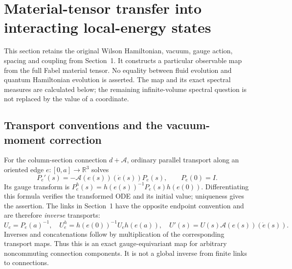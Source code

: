 \section{Material-tensor transfer into interacting local-energy states}
\label{sec:fabel-tensor}
This section retains the original Wilson Hamiltonian, vacuum, gauge action,
spacing and coupling from Section~1. It constructs a particular observable
map from the full Fabel material tensor. No equality between fluid evolution
and quantum Hamiltonian evolution is asserted. The map and its exact
spectral measures are calculated below; the remaining infinite-volume
spectral question is not replaced by the value of a coordinate.

\subsection{Transport conventions and the vacuum-moment correction}
For the column-section connection $d+\mathcal A$, ordinary parallel transport
along an oriented edge $e:[0,a]\to\mathbb R^3$ solves
\[
 P_e'(s)=-\mathcal A(e(s))(\dot e(s))P_e(s),\qquad P_e(0)=I.
\]
Its gauge transform is $P_e^h(s)=h(e(s))^{-1}P_e(s)h(e(0))$.
Differentiating this formula verifies the transformed ODE and its initial
value; uniqueness gives the assertion. The links in Section~1 have the
opposite endpoint convention and are therefore \emph{inverse} transports:
\begin{equation}\label{eq:fabel-inverse-transport}
 U_e=P_e(a)^{-1},\quad
 U_e^h=h(e(0))^{-1}U_eh(e(a)),\quad U'(s)=U(s)\mathcal A(e(s))(\dot e(s)).
\end{equation}
Inverses and concatenations follow by multiplication of the corresponding
transport maps. Thus this is an exact gauge-equivariant map for arbitrary
noncommuting connection components. It is not a global inverse from finite
links to connections.

